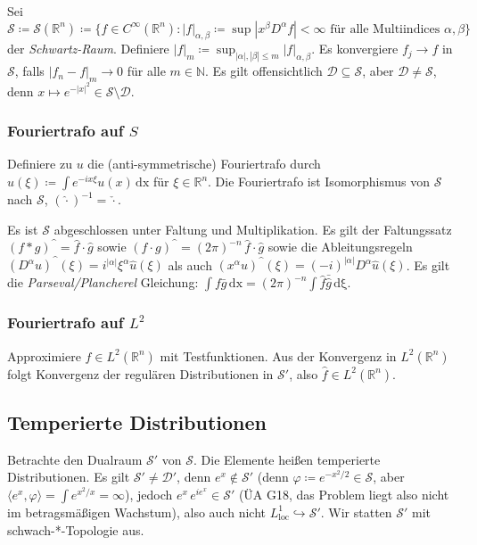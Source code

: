 \documentclass[11pt,a4paper]{scrartcl}
\newcommand{\N}{\mathbb{N}} %
\newcommand{\R}{\mathbb{R}} %
\newcommand{\D}{\mathcal{D}}
\newcommand{\Sc}{\mathcal{S}}
\newcommand{\circum}{\text{\textasciicircum}}
\theoremstyle{plain}
\theoremstyle{definition}
\theoremstyle{remark}
\DeclareMathOperator{\loc}{loc}
\begin{document}
Sei $\Sc\coloneqq \Sc(\R^n)\coloneqq \{ f\in C^\infty(\R^n): |f|_{\alpha,\beta} \coloneqq \sup |x^\beta D^\alpha f| < \infty \text{ für alle Multiindices } \alpha, \beta \}$ der \emph{Schwartz-Raum}. Definiere $|f|_m \coloneqq \sup_{|\alpha|,|\beta| \leq m} |f|_{\alpha,\beta}$. Es konvergiere $f_j \to f$ in $\Sc$, falls $|f_n-f|_m \to 0$ für alle $m\in \N$. Es gilt offensichtlich $\D \subseteq \Sc$, aber $\D \neq \Sc$, denn $x\mapsto e^{-|x|^2} \in \Sc\setminus \D$.


\subsubsection{Fouriertrafo auf $S$}

Definiere zu $u$ die (anti-symmetrische) Fouriertrafo durch $\hat u(\xi)\coloneqq \int e^{-ix\xi}u(x) \, \mathrm{dx}$ für $\xi\in\R^n$. Die Fouriertrafo ist Isomorphismus von $\Sc$ nach $\Sc$, $(\hat \cdot )^{-1} = \check\cdot$.

Es ist $\Sc$ abgeschlossen unter Faltung und Multiplikation. Es gilt der Faltungssatz $(f*g)^{\mbox{\textasciicircum}} = \hat f \cdot \hat g$ sowie $(f\cdot g)^{\mbox{\textasciicircum}} = (2\pi)^{-n} \, \hat f \cdot \hat g$ sowie die Ableitungsregeln $(D^\alpha u)^\circum(\xi) = i^{|\alpha|} \xi^\alpha \hat u(\xi)$ als auch $(x^\alpha u)^\circum(\xi) = (-i)^{|\alpha|} D^\alpha \hat u(\xi)$. Es gilt die \emph{Parseval/Plancherel} Gleichung: $\int f\bar g \, \mathrm{dx} = (2\pi)^{-n} \int \hat f \bar{\hat g} \, \mathrm{d\xi}$.

\subsubsection{Fouriertrafo auf $L^2$}

Approximiere $f\in L^2(\R^n)$ mit Testfunktionen. Aus der Konvergenz in $L^2(\R^n)$ folgt Konvergenz der regulären Distributionen in $\Sc'$, also $\hat f \in L^2(\R^n)$.

\subsection{Temperierte Distributionen}

Betrachte den Dualraum $\Sc'$ von $\Sc$. Die Elemente heißen temperierte Distributionen. Es gilt $\Sc'\neq \D'$, denn $e^x\not\in \Sc'$ (denn $\varphi\coloneqq e^{-x^2/2}\in \Sc$, aber $\langle e^x, \varphi \rangle = \int e^{x^2/x} = \infty$), jedoch $e^x\, e^{ie^x} \in \Sc'$ (ÜA G18, das Problem liegt also nicht im betragsmäßigen Wachstum), also auch nicht $L^1_{\loc} \hookrightarrow \Sc'$. Wir statten $\Sc'$ mit schwach-*-Topologie aus.
\end{document}
